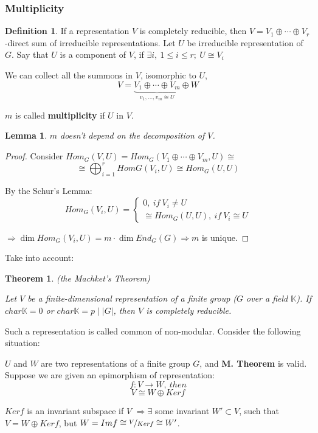 \documentclass[12pt, a4paper]{article}
\newtheorem{theorem}{Theorem}[section]
\newcounter{lemmacounter}
\newtheorem{lemma}[lemmacounter]{Lemma}
\theoremstyle{definition}
\newtheorem{definition}{Definition}[section]
\begin{document}
\subsubsection{Multiplicity}
\begin{definition}
    If a representation $V$ is completely reducible, then $V=V_1 \oplus \cdots \oplus V_r $
    -direct sum of irreducible representations.
    Let $U$ be irreducible representation of $G$. Say that $U$ is a component of $V$, if $
    \exists i,\ 1\leqslant i \leqslant r;\ U \cong V_i $
    \par
    We can collect all the summons in $V$, isomorphic to $U$, 
    \[V = \underbrace{V_1 \oplus \cdots \oplus V_m}_{v_1,\ldots,v_m \cong U} \oplus W \]
    \par
    $m$ is called \textbf{multiplicity} if $U$ in $V$. 
    \end{definition}
\begin{lemma}
    $m$ doesn't depend on the decomposition of $V$.
\end{lemma}
\begin{proof}
    Consider $Hom_G (V,U) = Hom_G(V_1 \oplus \cdots \oplus V_m, U) \cong$
    \[\cong \bigoplus_{i=1}^r HomG(V_i, U) \cong Hom_G(U, U ) \]
    \par
    By the Schur's Lemma:
    \[ Hom_G(V_i, U) = 
    \begin{cases}
        0,\ if\ V_i \neq U \\
        \cong Hom_G(U,U),\ if\ V_i\cong U
    \end{cases}
    \]
    \par
    $\Rightarrow \dim Hom_G (V_i, U) = m\cdot \dim End_G(G) \Rightarrow m $ is unique.
    \par
\end{proof}
Take into account:
\begin{theorem}
    (the Machket's Theorem)
    \par
    Let $V$ be a finite-dimensional representation of a finite group ($G$ over a field 
    $\mathbb{K}$). If $char \mathbb{K} = 0 $ or $char \mathbb{K} = p\mid |G| $, then $V$ is
    completely reducible.
\end{theorem}
\par
Such a representation is called common of non-modular. Consider the following situation:
\par
$U$ and $W$ are two representations of a finite group $G$, and \textbf{M. Theorem} is valid.
Suppose we are given an epimorphism of representation:
\[f:V \rightarrow W,\ then\]
\[V \cong W \oplus Kerf \]
\par
$Kerf$ is an invariant subspace if $V$ $\Rightarrow \exists $ some invariant $W'\subset V $, 
such that $V = W \oplus Kerf$, but $W = Imf \cong \nicefrac{V}{Kerf} \cong W'$.
\end{document}
